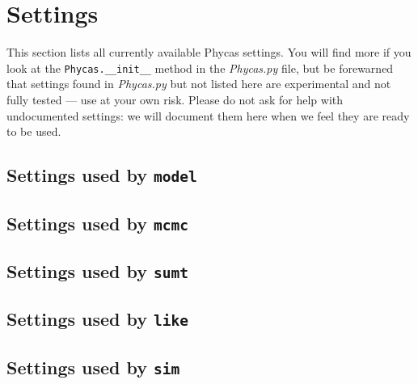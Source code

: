 \documentclass[10pt]{article}
\newcommand{\pathname}[1]{{\em #1}}			%
\newcommand{\code}[1]{{\tt #1}}				%
\begin{document}
\section{Settings}\label{sec:phycassettings}

This section lists all currently available Phycas settings. You will find more if you look at the \code{Phycas.\_\_init\_\_} method in the \pathname{Phycas.py} file, but be forewarned that settings found in \pathname{Phycas.py} but not listed here are experimental and not fully tested --- use at your own risk. Please do not ask for help with undocumented settings: we will document them here when we feel they are ready to be used.

\subsection{Settings used by \code{model}}\label{subsec:modelsettings}


\subsection{Settings used by \code{mcmc}}\label{subsec:mcmcsettings}


\subsection{Settings used by \code{sumt}}\label{subsec:sumtsettings}


\subsection{Settings used by \code{like}}\label{subsec:likesettings}


\subsection{Settings used by \code{sim}}\label{subsec:simsettings}


%
\end{document}
